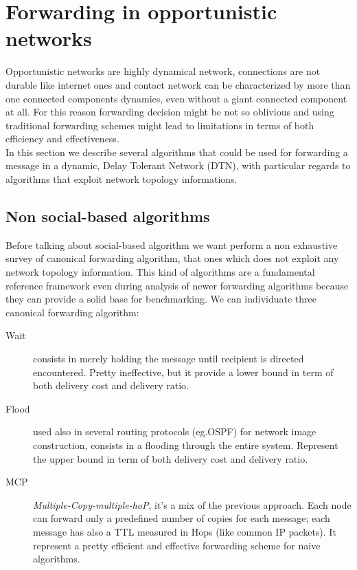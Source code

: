 \section{Forwarding in opportunistic networks}
\label{forwarding}

Opportunistic networks are highly dynamical network, connections are not durable like internet ones and contact network can be characterized by more than one connected components dynamics, even without a giant connected component at all. For this reason forwarding decision might be not so oblivious and using traditional forwarding schemes might lead to limitations in terms of both efficiency and effectiveness. \\ In this section we describe several algorithms that could be used for forwarding a message in a dynamic, Delay Tolerant Network (DTN), with particular regards to algorithms that exploit network topology informations.

\subsection{Non social-based algorithms}
\label{f_non_social}
Before talking about social-based algorithm we want perform a non exhaustive survey of canonical forwarding algorithm, that ones which does not exploit any network topology information. This kind of algorithms are a fundamental reference framework even during analysis of newer forwarding algorithms because they can provide a solid base for benchmarking. We can individuate three canonical forwarding algorithm:

\begin{description}
\item[Wait] consists in merely holding the message until recipient is directed encountered. Pretty ineffective, but it provide a lower bound in term of both delivery cost and delivery ratio.
\item[Flood] used also in several routing protocols (eg.OSPF) for network image construction, consists in a flooding through the entire system. Represent the upper bound in term of both delivery cost and delivery ratio.
\item[MCP] \emph{Multiple-Copy-multiple-hoP}, it's a mix of the previous approach. Each node can forward only a predefined number of copies for each message; each message has also a TTL measured in Hops (like common IP packets). It represent a pretty efficient and effective forwarding scheme for naive algorithms.\end{description} 


